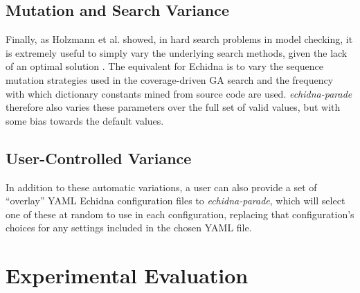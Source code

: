 \documentclass[sigconf]{acmart}
\begin{document}
{\subsection{Mutation and Search Variance}

Finally, as Holzmann et al. showed, in hard search problems in model
checking, it is extremely useful to simply vary the underlying search
methods, given the lack of an optimal solution \cite{swarmIEEE}.  The
equivalent for Echidna is to vary the sequence mutation strategies
used in the coverage-driven GA search and the frequency with which
dictionary constants mined from source code are used.
\emph{echidna-parade} therefore also varies these parameters over the
full set of valid values, but with some bias towards the default values.

\subsection{User-Controlled Variance}

In addition to these automatic variations, a user can also provide a
set of ``overlay'' YAML Echidna configuration files to
\emph{echidna-parade}, which will select one of these at random to use
in each configuration, replacing that configuration's choices for any
settings included in the chosen YAML file.

\section{Experimental Evaluation}


}
\end{document}
